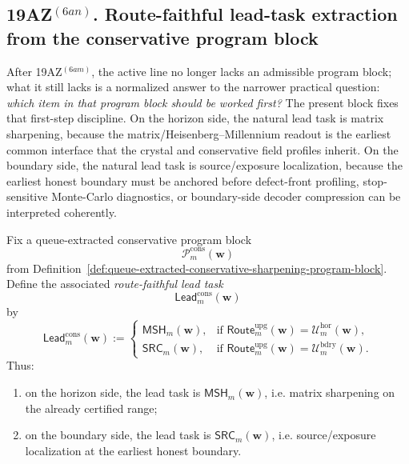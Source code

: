 \subsection*{19AZ$^{(6an)}$. Route-faithful lead-task extraction from the conservative program block}
\label{sec:route-faithful-lead-task-extraction-from-the-conservative-program-block}
After 19AZ$^{(6am)}$, the active line no longer lacks an admissible program block; what it still lacks is a normalized answer to the narrower practical question: \emph{which item in that program block should be worked first?} The present block fixes that first-step discipline. On the horizon side, the natural lead task is matrix sharpening, because the matrix/Heisenberg--Millennium readout is the earliest common interface that the crystal and conservative field profiles inherit. On the boundary side, the natural lead task is source/exposure localization, because the earliest honest boundary must be anchored before defect-front profiling, stop-sensitive Monte-Carlo diagnostics, or boundary-side decoder compression can be interpreted coherently.

\begin{definition}
\label{def:route-faithful-lead-task}
Fix a queue-extracted conservative program block
\[
  \mathcal P^{\mathrm{cons}}_{m}(\mathbf w)
\]
from Definition~\ref{def:queue-extracted-conservative-sharpening-program-block}.
Define the associated \emph{route-faithful lead task}
\[
  \mathsf{Lead}^{\mathrm{cons}}_{m}(\mathbf w)
\]
by
\[
  \mathsf{Lead}^{\mathrm{cons}}_{m}(\mathbf w)
  :=
  \begin{cases}
    \mathsf{MSH}_{m}(\mathbf w), & \text{if }\mathsf{Route}^{\mathrm{upg}}_{m}(\mathbf w)=\mathcal U^{\mathrm{hor}}_{m}(\mathbf w),\\[2mm]
    \mathsf{SRC}_{m}(\mathbf w), & \text{if }\mathsf{Route}^{\mathrm{upg}}_{m}(\mathbf w)=\mathcal U^{\mathrm{bdry}}_{m}(\mathbf w).
  \end{cases}
\]
Thus:
\begin{enumerate}[label=(\roman*)]
  \item on the horizon side, the lead task is \(\mathsf{MSH}_{m}(\mathbf w)\), i.e. matrix sharpening on the already certified range;
  \item on the boundary side, the lead task is \(\mathsf{SRC}_{m}(\mathbf w)\), i.e. source/exposure localization at the earliest honest boundary.
\end{enumerate}
\end{definition}

